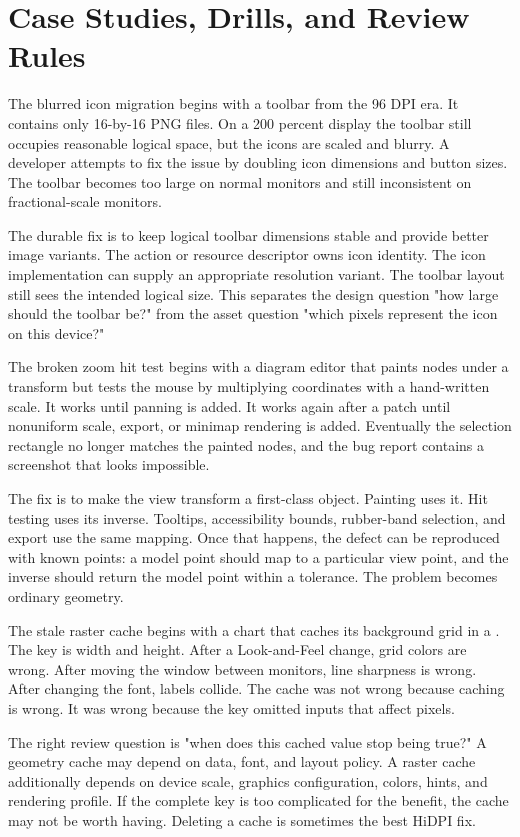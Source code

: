 \section{Case Studies, Drills, and Review Rules}

The blurred icon migration begins with a toolbar from the 96 DPI era. It contains only 16-by-16 PNG files. On a 200 percent display the toolbar still occupies reasonable logical space, but the icons are scaled and blurry. A developer attempts to fix the issue by doubling icon dimensions and button sizes. The toolbar becomes too large on normal monitors and still inconsistent on fractional-scale monitors.

The durable fix is to keep logical toolbar dimensions stable and provide better image variants. The action or resource descriptor owns icon identity. The icon implementation can supply an appropriate resolution variant. The toolbar layout still sees the intended logical size. This separates the design question "how large should the toolbar be?" from the asset question "which pixels represent the icon on this device?"

The broken zoom hit test begins with a diagram editor that paints nodes under a transform but tests the mouse by multiplying coordinates with a hand-written scale. It works until panning is added. It works again after a patch until nonuniform scale, export, or minimap rendering is added. Eventually the selection rectangle no longer matches the painted nodes, and the bug report contains a screenshot that looks impossible.

The fix is to make the view transform a first-class object. Painting uses it. Hit testing uses its inverse. Tooltips, accessibility bounds, rubber-band selection, and export use the same mapping. Once that happens, the defect can be reproduced with known points: a model point should map to a particular view point, and the inverse should return the model point within a tolerance. The problem becomes ordinary geometry.

The stale raster cache begins with a chart that caches its background grid in a . The key is width and height. After a Look-and-Feel change, grid colors are wrong. After moving the window between monitors, line sharpness is wrong. After changing the font, labels collide. The cache was not wrong because caching is wrong. It was wrong because the key omitted inputs that affect pixels.

The right review question is "when does this cached value stop being true?" A geometry cache may depend on data, font, and layout policy. A raster cache additionally depends on device scale, graphics configuration, colors, hints, and rendering profile. If the complete key is too complicated for the benefit, the cache may not be worth having. Deleting a cache is sometimes the best HiDPI fix.

